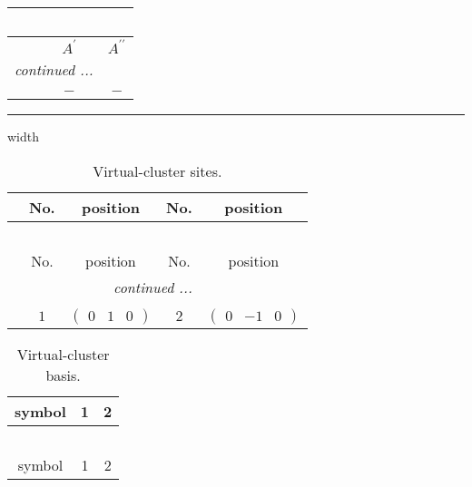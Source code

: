 \documentclass[fleqn,10pt,landscape]{article}
\begin{document}
\begin{itemize}
\begin{center}
\begin{longtable}{ccc}
\multicolumn{2}{l}{\tablename\ \thetable{}} \\
 \hline \hline
 & $ A^{\prime} $ & $ A^{\prime\prime} $ \\ \hline \endhead

 \hline \hline
\multicolumn{2}{r}{\footnotesize\it continued ...} \\ \endfoot

 \hline \hline
\multicolumn{2}{r}{} \\ \endlastfoot

$  $ & $ - $ & $ - $ \\
\end{longtable}
\end{center}

 \hfil \hrule height 1mm width \textwidth \hfil

{
\scriptsize
\begin{center}
\renewcommand{\arraystretch}{1.7}
\begin{longtable}{ccccc}
\caption{Virtual-cluster sites.}
 \\
 \hline \hline
 & No. & position & No. & position \\ \hline \endfirsthead

\multicolumn{4}{l}{\tablename\ \thetable{}} \\
 \hline \hline
 & No. & position & No. & position \\ \hline \endhead

 \hline \hline
\multicolumn{4}{r}{\footnotesize\it continued ...} \\ \endfoot

 \hline \hline
\multicolumn{4}{r}{} \\ \endlastfoot

 & $ 1 $ & $ \begin{pmatrix} 0 & 1 & 0 \end{pmatrix} $ & $ 2 $ & $ \begin{pmatrix} 0 & -1 & 0 \end{pmatrix} $ \\
\end{longtable}
\end{center}
\begin{center}
\renewcommand{\arraystretch}{1.7}
\begin{longtable}{ccc}
\caption{Virtual-cluster basis.}
 \\
 \hline \hline
symbol & 1 & 2 \\ \hline \endfirsthead

\multicolumn{2}{l}{\tablename\ \thetable{}} \\
 \hline \hline
symbol & 1 & 2 \\ \hline \endhead


\end{longtable}
\end{center}}
\end{itemize}
\end{document}
